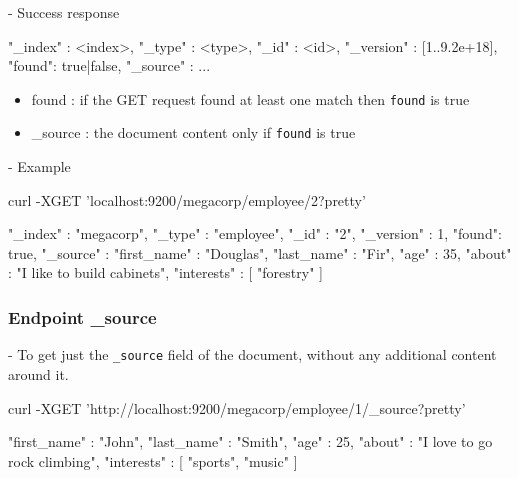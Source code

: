 \documentclass[]{beamer}
\begin{document}
\begin{frame}[containsverbatim]{\subsecname{} - Success response}
  \begin{command}
{
  "_index" : <index>,
  "_type" : <type>,
  "_id" : <id>,
  "_version" : [1..9.2e+18],
  "found": true|false,
  "_source" : {
    ...
  }
}
  \end{command}

  \begin{itemize}
    \item found : if the GET request found at least one match then \texttt{found} is true
    \item \_source : the document content only if \texttt{found} is true
  \end{itemize}
\end{frame}

\begin{frame}[containsverbatim]{\subsecname{} - Example}
  \begin{command}
curl -XGET 'localhost:9200/megacorp/employee/2?pretty'
  \end{command}

  \begin{command}
{
  "_index" : "megacorp",
  "_type" : "employee",
  "_id" : "2",
  "_version" : 1,
  "found": true,
  "_source" : {
    "first_name" : "Douglas",
    "last_name"  : "Fir",
    "age"        : 35,
    "about"      : "I like to build cabinets",
    "interests"  : [ "forestry" ]
  }
}
  \end{command}
\end{frame}

\subsubsection{Endpoint \_source}

\begin{frame}[containsverbatim]{\subsecname{} - \subsubsecname{}}
  To get just the \texttt{\_source} field of the document, without any additional content around it.

  \begin{command}
curl -XGET 'http://localhost:9200/megacorp/employee/1/_source?pretty'
  \end{command}

  \begin{command}
{
  "first_name" : "John",
  "last_name"  : "Smith",
  "age"        : 25,
  "about"      : "I love to go rock climbing",
  "interests"  : [ "sports", "music" ]
}
  \end{command}
\end{frame}
\end{document}
